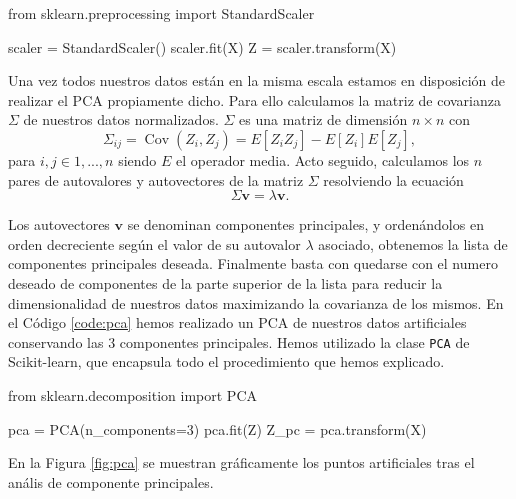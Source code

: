 \begin{mypython}[float={h}, caption={Escalar y estandarizar los datos.}, label={code:standar}]
  from sklearn.preprocessing import StandardScaler

  scaler = StandardScaler()
  scaler.fit(X)
  Z = scaler.transform(X)
\end{mypython}

Una vez todos nuestros datos están en la misma escala estamos en disposición de realizar el PCA propiamente dicho. Para ello calculamos la matriz de covarianza $ \Sigma $ de nuestros datos normalizados. $ \Sigma $ es una matriz de dimensión $ n \times n $ con
\begin{equation}
  \Sigma_{ij} = \operatorname{Cov}(Z_{i},Z_{j}) = E[Z_{i}Z_{j}] - E[Z_{i}] E[Z_{j}],
\end{equation}
para $ i, j \in {1, ..., n} $ siendo $ E $ el operador media. Acto seguido, calculamos los $ n $ pares de autovalores y autovectores de la matriz $ \Sigma $ resolviendo la ecuación
\begin{equation}
  \Sigma \textbf{v} = \lambda \textbf{v}.
\end{equation}

Los autovectores $ \textbf{v} $ se denominan componentes principales, y ordenándolos en orden decreciente según el valor de su autovalor $ \lambda $ asociado, obtenemos la lista de componentes principales deseada. Finalmente basta con quedarse con el numero deseado de componentes de la parte superior de la lista para reducir la dimensionalidad de nuestros datos maximizando la covarianza de los mismos. En el Código \ref{code:pca} hemos realizado un PCA de nuestros datos artificiales conservando las 3 componentes principales. Hemos utilizado la clase \texttt{PCA} de Scikit-learn, que encapsula todo el procedimiento que hemos explicado. 

\begin{mypython}[float={h}, caption={Realizar un PCA.}, label={code:pca}]
  from sklearn.decomposition import PCA

  pca = PCA(n_components=3)
  pca.fit(Z)
  Z_pc = pca.transform(X)
\end{mypython}

En la Figura \ref{fig:pca} se muestran gráficamente los puntos artificiales tras el anális de componente principales.

